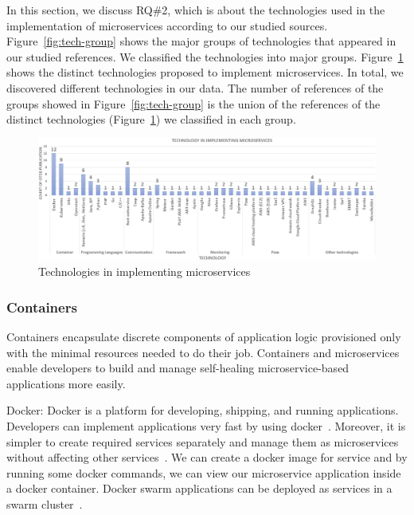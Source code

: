 In this section, we discuss RQ\#2, which is about the technologies used in the implementation of microservices according to our studied sources. Figure~\ref{fig:tech-group} shows the major groups of technologies that appeared in our studied references. We classified the technologies into \techgroupcount major groups.
Figure~\ref{fig:tech-distinct} shows the distinct technologies proposed to implement microservices. In total, we discovered \techcount different technologies in our data. 
The number of references of the groups showed in Figure~\ref{fig:tech-group} is the union of the references of the distinct technologies (Figure~\ref{fig:tech-distinct}) we classified in each group.  

\begin{figure}[t]
	\centering
	\includegraphics[width=\linewidth]{images/commontechupdated.png}
	\caption{Technologies in implementing microservices }
	\label{fig:tech-distinct}
\end{figure}


\subsubsection{Containers}
Containers encapsulate discrete components of application logic provisioned only with the minimal resources needed to do their job. Containers and microservices enable developers to build and manage self-healing microservice-based applications more easily.
 
\par Docker: Docker is a platform for developing, shipping, and running applications. Developers can implement applications very fast by using docker~\cite{Sharaf2019, Kristiani2020, khan2020}. Moreover, it is simpler to create required services separately and manage them as microservices without affecting other services~\cite{leo2019, Hou2020, Kalske2017, Bahadori2018}. We can create a docker image for service and by running some docker commands, we can view our microservice application inside a docker container. Docker swarm applications can be deployed as services in a swarm cluster~\cite{Falatiuk2019, Venugopal2017, coulson2020}.
	
